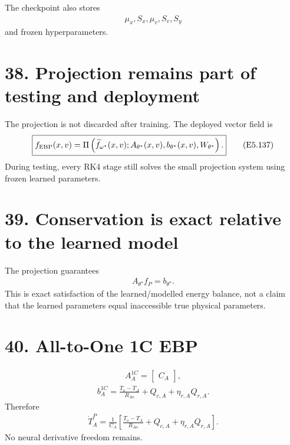 \documentclass[11pt]{article}
\begin{document}
The checkpoint also stores
\begin{align}
\boxed{\mu_x,S_x,\mu_v,S_v,S_y}
\tag{E5.136}
\end{align}
and frozen hyperparameters.

\section*{38. Projection remains part of testing and deployment}

The projection is not discarded after training. The deployed vector field is
\begin{align}
\boxed{f_{\rm EBP}(x,v)=\Pi\left(\widetilde f_{\omega^\star}(x,v);A_{\theta^\star}(x,v),b_{\theta^\star}(x,v),W_{\theta^\star}\right).}
\tag{E5.137}
\end{align}
During testing, every RK4 stage still solves the small projection system using frozen learned parameters.

\section*{39. Conservation is exact relative to the learned model}

The projection guarantees
\begin{align}
\boxed{A_{\theta^\star}f_P=b_{\theta^\star}.}
\tag{E5.138}
\end{align}
This is exact satisfaction of the learned/modelled energy balance, not a claim that the learned parameters equal inaccessible true physical parameters.

\section*{40. All-to-One 1C EBP}

\begin{align}
\boxed{A_A^{1C}=\begin{bmatrix}C_A\end{bmatrix},}
\tag{E5.139}
\end{align}
\begin{align}
\boxed{b_A^{1C}=\frac{T_o-T_A}{R_{Ao}}+Q_{c,A}+\eta_{r,A}Q_{r,A}.}
\tag{E5.140}
\end{align}
Therefore
\begin{align}
\boxed{\dot T_A^P=\frac{1}{C_A}\left[\frac{T_o-T_A}{R_{Ao}}+Q_{c,A}+\eta_{r,A}Q_{r,A}\right].}
\tag{E5.141}
\end{align}
No neural derivative freedom remains.
\end{document}
